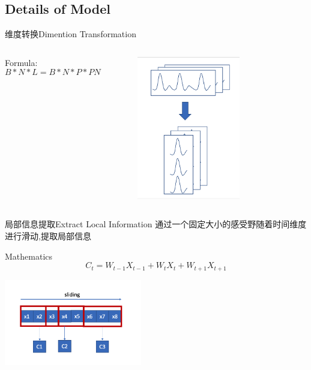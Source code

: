 \documentclass{ctexbeamer}
\begin{document}
\subsection{Details of Model}
\begin{frame}{维度转换}{Dimention Transformation}
    \begin{columns}
        \begin{center}
            \begin{block}{Formula:}
                \begin{equation*}
                    B*N*L = B*N*P*PN
                \end{equation*}

            \end{block}   
        \end{center}
            \begin{figure}
                \centering
                \includegraphics[width=4.5cm]{维度变换}
            \end{figure}
    \end{columns}
\end{frame}

\begin{frame}{局部信息提取}{Extract Local Information}
    通过一个固定大小的感受野随着时间维度进行滑动,提取局部信息
    \begin{center}
        \begin{block}{Mathematics}
        \begin{equation*}
            C_t = W_{t-1}X_{t-1}+W_t X_t+W_{t+1}X_{t+1}
        \end{equation*}
        \end{block}
    \end{center}
    \begin{center}
    \includegraphics[width=6cm]{Conv1d}
    \end{center}
\end{frame}
\end{document}
